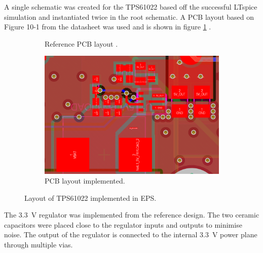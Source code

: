 \documentclass[]{report}
\begin{document}
A single schematic was created for the TPS61022 based off the successful LTspice simulation and instantiated twice in the root schematic. A PCB layout based on Figure 10-1 from the datasheet was used and is shown in figure \ref{fig:TPS61022-layout} \cite{ti2021tps61022}.

\begin{figure}[H]
  \begin{subfigure}{0.495\textwidth}
    \centering
    
    \caption{Reference PCB layout \cite{ti2021tps61022}.}
  \end{subfigure}
  \begin{subfigure}{0.495\textwidth}
    \centering
    \includegraphics[width=\linewidth]{images/TPS61022-pcb-layout.svg.png}
    \caption{PCB layout implemented.}
  \end{subfigure}
  \caption{Layout of TPS61022 implemented in EPS.}
  \label{fig:TPS61022-layout}
\end{figure}

The \SI{3.3}{\volt} regulator was implemented from the reference design. The two ceramic capacitors were placed close to the regulator inputs and outputs to minimise noise. The output of the regulator is connected to the internal \SI{3.3}{\volt} power plane through multiple vias.
\end{document}
